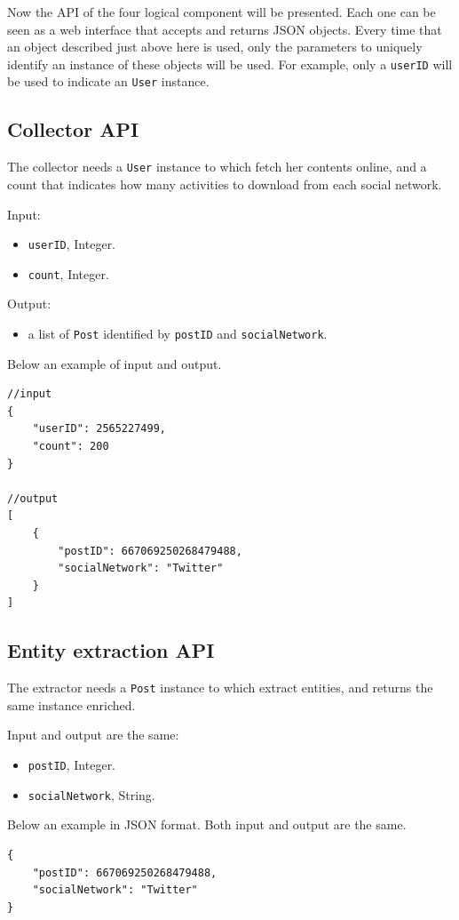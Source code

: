 Now the API of the four logical component will be presented. Each one can be seen as a web interface that accepts and returns JSON objects. Every time that an object described just above here is used, only the parameters to uniquely identify an instance of these objects will be used. For example, only a \texttt{userID} will be used to indicate an \texttt{User} instance.

\subsection{Collector API}
The collector needs a \texttt{User} instance to which fetch her contents online, and a count that indicates how many activities to download from each social network.

Input:
\begin{itemize}
\item \texttt{userID}, Integer.
\item \texttt{count}, Integer.
\end{itemize}

Output:
\begin{itemize}
\item a list of \texttt{Post} identified by \texttt{postID} and \texttt{socialNetwork}.
\end{itemize}

Below an example of input and output.

\begin{Verbatim}
//input
{
	"userID": 2565227499,
	"count": 200
}

//output
[
	{
		"postID": 667069250268479488,
		"socialNetwork": "Twitter"
	}
]
\end{Verbatim}

\subsection{Entity extraction API}
The extractor needs a \texttt{Post} instance to which extract entities, and returns the same instance enriched.

Input and output are the same:
\begin{itemize}
\item \texttt{postID}, Integer.
\item \texttt{socialNetwork}, String.
\end{itemize}

Below an example in JSON format. Both input and output are the same.

\begin{Verbatim}
{
	"postID": 667069250268479488,
	"socialNetwork": "Twitter"
}
\end{Verbatim}

